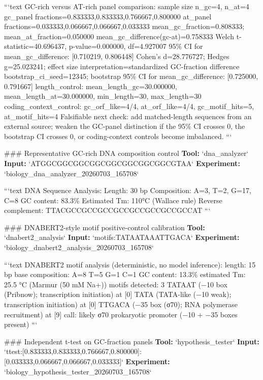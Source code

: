 \documentclass[11pt,a4paper]{article}
\begin{document}
```text
GC-rich versus AT-rich panel comparison:
  sample size n\_gc=4, n\_at=4
  gc\_panel fractions=0.833333,0.833333,0.766667,0.800000
  at\_panel fractions=0.033333,0.066667,0.066667,0.033333
  mean\_gc\_fraction=0.808333; mean\_at\_fraction=0.050000
  mean\_gc\_difference(gc-at)=0.758333
  Welch t-statistic=40.696437, p-value=0.000000, df=4.927007
  95\% CI for mean\_gc\_difference: [0.710219, 0.806448]
  Cohen's d=28.776727; Hedges g=25.023241; effect size interpretation=standardized GC-fraction difference
  bootstrap\_ci\_seed=12345; bootstrap 95\% CI for mean\_gc\_difference: [0.725000, 0.791667]
  length\_control: mean\_length\_gc=30.000000, mean\_length\_at=30.000000, min\_length=30, max\_length=30
  coding\_context\_control: gc\_orf\_like=4/4, at\_orf\_like=4/4, gc\_motif\_hits=5, at\_motif\_hits=4
  Falsifiable next check: add matched-length sequences from an external source; weaken the GC-panel distinction if the 95\% CI crosses 0, the bootstrap CI crosses 0, or coding-context controls become imbalanced.
```

\#\#\# Representative GC-rich DNA composition control
\textbf{Tool:} `dna\_analyzer`
\textbf{Input:} `ATGGCGGCGGCGGCGGCGGCGGCGGCGTAA`
\textbf{Experiment:} `biology\_dna\_analyzer\_20260703\_165708`

```text
DNA Sequence Analysis:
  Length: 30 bp
  Composition: A=3, T=2, G=17, C=8
  GC content: 83.3\%
  Estimated Tm: 110°C (Wallace rule)
  Reverse complement: TTACGCCGCCGCCGCCGCCGCCGCCGCCAT
```

\#\#\# DNABERT2-style motif positive-control calibration
\textbf{Tool:} `dnabert2\_analysis`
\textbf{Input:} `motifs:TATAATAAATTGACA`
\textbf{Experiment:} `biology\_dnabert2\_analysis\_20260703\_165708`

```text
DNABERT2 motif analysis (deterministic, no model inference):
  length: 15 bp
  base composition: A=8 T=5 G=1 C=1
  GC content: 13.3\%
  estimated Tm: 25.5 °C  (Marmur (50 mM Na+))
  motifs detected: 3
    TATAAT  (−10 box (Pribnow); transcription initiation)  at [0]
    TATA  (TATA-like (−10 weak); transcription initiation)  at [0]
    TTGACA  (−35 box (σ70); RNA polymerase recruitment)  at [9]
  call: likely σ70 prokaryotic promoter (−10 + −35 boxes present)
```

\#\#\# Independent t-test on GC-fraction panels
\textbf{Tool:} `hypothesis\_tester`
\textbf{Input:} `ttest:[0.833333,0.833333,0.766667,0.800000]:[0.033333,0.066667,0.066667,0.033333]`
\textbf{Experiment:} `biology\_hypothesis\_tester\_20260703\_165708`
\end{document}

